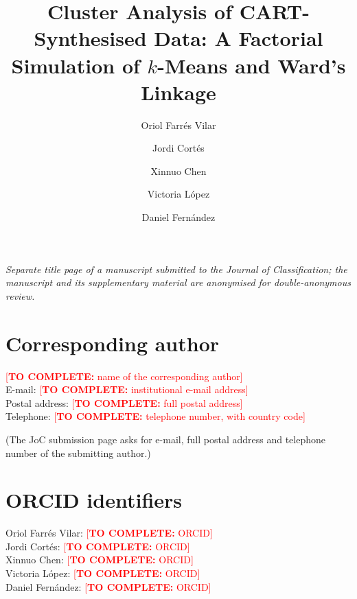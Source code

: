 \documentclass[pdflatex,referee]{sn-jnl}
\newcommand\TODO[1]{\textcolor{red}{[\textbf{TO COMPLETE:} #1]}}
\begin{document}
\title{Cluster Analysis of CART-Synthesised Data: A Factorial Simulation of
       $k$-Means and Ward's Linkage}

\author[1]{Oriol Farr\'es Vilar}
\author[2]{Jordi Cort\'es}
\author[3]{Xinnuo Chen}
\author[4]{Victoria L\'opez}
\author[2]{Daniel Fern\'andez}


\abstract{}


\maketitle

\noindent\emph{Separate title page of a manuscript submitted to the Journal of
Classification; the manuscript and its supplementary material are anonymised
for double-anonymous review.}

\section*{Corresponding author}

\noindent\TODO{name of the corresponding author}\\
E-mail: \TODO{institutional e-mail address}\\
Postal address: \TODO{full postal address}\\
Telephone: \TODO{telephone number, with country code}

\noindent (The JoC submission page asks for e-mail, full postal address and
telephone number of the submitting author.)

\section*{ORCID identifiers}

\noindent
Oriol Farr\'es Vilar: \TODO{ORCID}\\
Jordi Cort\'es: \TODO{ORCID}\\
Xinnuo Chen: \TODO{ORCID}\\
Victoria L\'opez: \TODO{ORCID}\\
Daniel Fern\'andez: \TODO{ORCID}
\end{document}
